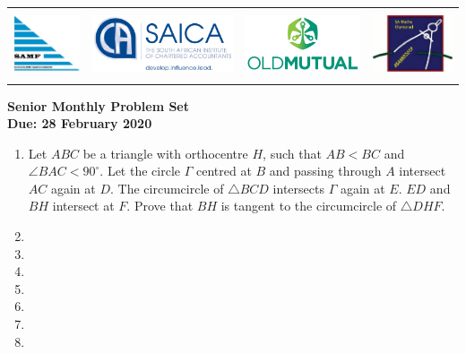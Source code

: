 \documentclass{article}
\begin{document}
\setlength{\tabcolsep}{6pt}
\begin{center} \begin{tabular}{cccc}
	\includegraphics[height=56pt]{SAMF_logo.jpg} &
	\includegraphics[height=56pt]{SAICA_logo.jpg} &
	\includegraphics[height=56pt]{OM_Logo_Stacked_Vignette_on_White_RGB.jpg} &
	\includegraphics[height=56pt]{SAMO2019.png}
\end{tabular} \end{center}


\bigskip


\begin{center}
\textbf{\Large Senior Monthly Problem Set}
\\ \vspace{1em}
\textbf{\large Due: 28 February 2020}
\end{center}

\begin{enumerate}

\medskip
\item %
Let $ABC$ be a triangle with orthocentre $H$, such that $AB<BC$ and $\angle BAC < 90^\circ$. Let the circle $\Gamma$ centred at $B$ and passing through $A$ intersect $AC$ again at $D$. The circumcircle of $\triangle BCD$ intersects $\Gamma$ again at $E$. $ED$ and $BH$ intersect at $F$. Prove that $BH$ is tangent to the circumcircle of $\triangle DHF$.


\medskip
\item


\medskip
\item


\medskip
\item


\medskip
\item


\medskip
\item


\medskip
\item


\medskip
\item


\end{enumerate}
\end{document}
